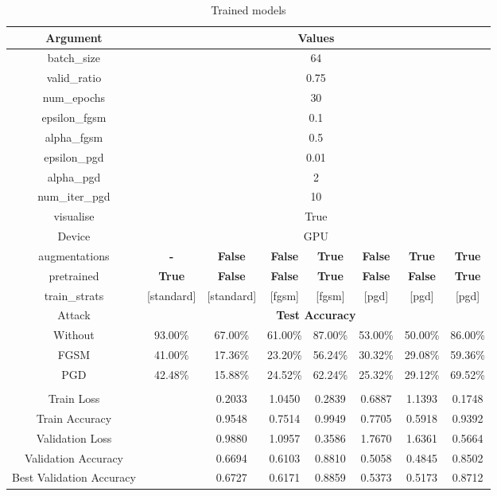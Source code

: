 \documentclass{article}
\begin{document}
\begin{table}[H]
    \centering
    \begin{tabular}{|c|ccccccc|}
    \hline
    \textbf{Argument} & \multicolumn{7}{|c|}{\textbf{Values}} \\
    \hline
    batch\_size &       \multicolumn{7}{c|}{64} \\
    valid\_ratio &      \multicolumn{7}{c|}{0.75} \\
    num\_epochs &       \multicolumn{7}{c|}{30} \\
    epsilon\_fgsm &     \multicolumn{7}{c|}{0.1} \\
    alpha\_fgsm &       \multicolumn{7}{c|}{0.5} \\
    epsilon\_pgd &      \multicolumn{7}{c|}{0.01} \\
    alpha\_pgd &        \multicolumn{7}{c|}{2} \\
    num\_iter\_pgd &    \multicolumn{7}{c|}{10} \\
    visualise &         \multicolumn{7}{c|}{True} \\
    Device &            \multicolumn{7}{c|}{GPU} \\
    augmentations & \textbf{-}  & \textbf{False} & \textbf{False} & \textbf{True} & \textbf{False} & \textbf{True} & \textbf{True}\\
    pretrained & \textbf{True}  & \textbf{False} & \textbf{False} & \textbf{True} & \textbf{False} & \textbf{False}& \textbf{True}\\
    train\_strats & [standard] & [standard] & [fgsm] & [fgsm] & [pgd] & [pgd] & [pgd] \\
    \hline
    Attack & \multicolumn{7}{c|}{\textbf{Test Accuracy}}\\
    \hline
    Without     & 93.00\% & 67.00\% & 61.00\% & 87.00\% & 53.00\% & 50.00\% & 86.00\% \\
    FGSM        & 41.00\% & 17.36\% & 23.20\% & 56.24\% & 30.32\% & 29.08\% & 59.36\% \\
    PGD         & 42.48\% & 15.88\% & 24.52\% & 62.24\% & 25.32\% & 29.12\% & 69.52\%\\
    \hline
    \multicolumn{8}{|c|}{\textbf{}}\\
    \hline
    Train Loss                  & & 0.2033 & 1.0450 & 0.2839 & 0.6887 &1.1393 &0.1748 \\
    Train Accuracy              & & 0.9548 & 0.7514 & 0.9949 & 0.7705 &0.5918 &0.9392 \\
    Validation Loss             & & 0.9880 & 1.0957 & 0.3586 & 1.7670 &1.6361 & 0.5664 \\
    Validation Accuracy         & & 0.6694 & 0.6103 & 0.8810 & 0.5058 &0.4845 & 0.8502 \\
    Best Validation Accuracy    & & 0.6727 & 0.6171 & 0.8859 & 0.5373 &0.5173 &0.8712 \\
    \hline
    \end{tabular}
    \caption{Trained models}
\end{table}
\end{document}
